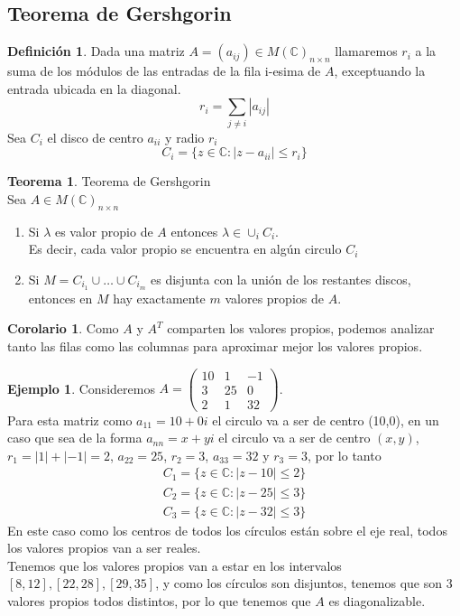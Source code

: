 \documentclass[10pt]{article}
\theoremstyle{definition}
\newtheorem{definition}{Definición}[section]
\newtheorem{theorem}{Teorema}[section]
\newtheorem{corollary}{Corolario}[theorem]
\newtheorem{example}{Ejemplo}[section]
\begin{document}
\subsection{Teorema de Gershgorin}
\begin{definition}
	Dada una matriz $A=(a_{ij})\in M(\mathbb{C})_{n\times n}$ llamaremos $r_i$ a la suma de los módulos de las entradas de la fila i-esima de $A$, exceptuando la entrada ubicada en la diagonal.
	$$r_i=\sum_{j\neq i} |a_{ij}|$$
	Sea $C_i$ el disco de centro $a_{ii}$ y radio $r_i$ $$C_i=\{z\in\mathbb{C} : |z-a_{ii}|\le r_i\}$$
\end{definition}
\begin{theorem}{Teorema de Gershgorin}
	\\Sea $A\in M(\mathbb{C})_{n\times n}$
	\begin{enumerate}
		\item Si $\lambda$ es valor propio de $A$ entonces $\lambda\in\cup _{i}C_i$.\\Es decir, cada valor propio se encuentra en algún circulo $C_i$
		\item Si $M=C_{i_1} \cup\dots\cup C_{i_m}$ es disjunta con la unión de los restantes discos, entonces en $M$ hay exactamente $m$ valores propios de $A$.
	\end{enumerate}
\end{theorem}
\begin{corollary}
	Como $A$ y $A^T$ comparten los valores propios, podemos analizar tanto las filas como las columnas para aproximar mejor los valores propios.
\end{corollary}
\begin{example}
	Consideremos $A=\begin{pmatrix} 10&1&-1\\3&25&0\\2&1&32 \end{pmatrix} $.
	\\Para esta matriz como $a_{11}=10+0i$ el circulo va a ser de centro (10,0), en un caso que sea de la forma $a_{nn}=x+yi$ el circulo va a ser de centro $(x,y)$, $r_1=|1|+|-1|=2$, $a_{22}=25$, $r_2=3$, $a_{33}=32$ y $r_3=3$, por lo tanto $$ \begin{array}{l}
			C_{1} =\{z\in \mathbb{C} :|z-10|\leq 2\} \\
			C_{2} =\{z\in \mathbb{C} :|z-25|\leq 3\} \\
			C_{3} =\{z\in \mathbb{C} :|z-32|\leq 3\}
		\end{array}$$
	En este caso como los centros de todos los círculos están sobre el eje real, todos los valores propios van a ser reales.\\
	Tenemos que los valores propios van a estar en los intervalos $[8,12], [22,28], [29,35]$, y como los círculos son disjuntos, tenemos que son 3 valores propios todos distintos, por lo que tenemos que $A$ es diagonalizable.
\end{example}\newpage
\end{document}
